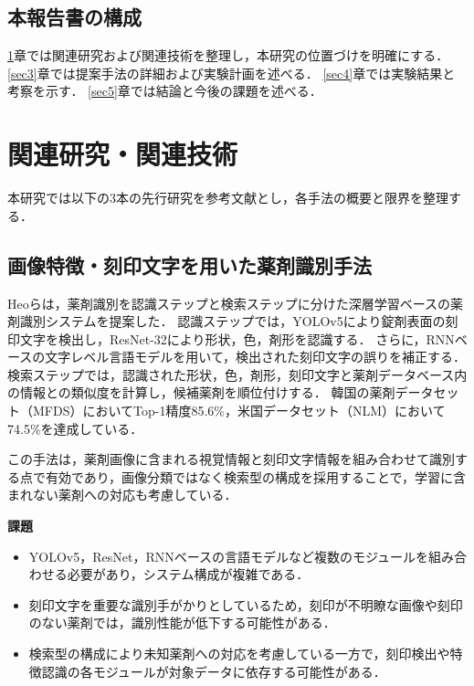 \documentclass[dvipdfmx]{jsarticle}
\begin{document}
\subsection{本報告書の構成}

\ref{sec2}章では関連研究および関連技術を整理し，本研究の位置づけを明確にする．
\ref{sec3}章では提案手法の詳細および実験計画を述べる．
\ref{sec4}章では実験結果と考察を示す．
\ref{sec5}章では結論と今後の課題を述べる．

\newpage

\section{関連研究・関連技術}\label{sec2}

本研究では以下の3本の先行研究を参考文献とし，各手法の概要と限界を整理する．

\subsection{画像特徴・刻印文字を用いた薬剤識別手法}

Heoら\cite{heo2023pill}は，薬剤識別を認識ステップと検索ステップに分けた深層学習ベースの薬剤識別システムを提案した．
認識ステップでは，YOLOv5により錠剤表面の刻印文字を検出し，ResNet-32により形状，色，剤形を認識する．
さらに，RNNベースの文字レベル言語モデルを用いて，検出された刻印文字の誤りを補正する．
検索ステップでは，認識された形状，色，剤形，刻印文字と薬剤データベース内の情報との類似度を計算し，候補薬剤を順位付けする．
韓国の薬剤データセット（MFDS）においてTop-1精度85.6\%，米国データセット（NLM）において74.5\%を達成している．

この手法は，薬剤画像に含まれる視覚情報と刻印文字情報を組み合わせて識別する点で有効であり，画像分類ではなく検索型の構成を採用することで，学習に含まれない薬剤への対応も考慮している．

\textbf{課題}
\begin{itemize}
  \item YOLOv5，ResNet，RNNベースの言語モデルなど複数のモジュールを組み合わせる必要があり，システム構成が複雑である．
  \item 刻印文字を重要な識別手がかりとしているため，刻印が不明瞭な画像や刻印のない薬剤では，識別性能が低下する可能性がある．
  \item 検索型の構成により未知薬剤への対応を考慮している一方で，刻印検出や特徴認識の各モジュールが対象データに依存する可能性がある．
\end{itemize}
\end{document}
